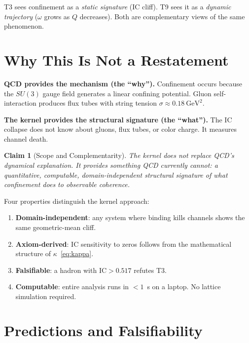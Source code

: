 \documentclass[
  aps,
  prd,
  twocolumn,
  superscriptaddress,
  nofootinbib,
  floatfix
]{revtex4-2}
\newtheorem{claim}{Claim}
\newcommand{\IC}{\mathrm{IC}}
\begin{document}
T3 sees confinement as a \emph{static signature} (IC cliff).
T9 sees it as a \emph{dynamic trajectory} ($\omega$ grows as
$Q$ decreases).  Both are complementary views of the same
phenomenon.


\section{Why This Is Not a Restatement}\label{sec:novelty}

\textbf{QCD provides the mechanism (the ``why'').}
Confinement occurs because the $SU(3)$ gauge field generates a
linear confining potential.  Gluon self-interaction produces
flux tubes with string tension
$\sigma \approx 0.18~\mathrm{GeV}^2$.

\textbf{The kernel provides the structural signature
(the ``what'').}  The IC collapse does not know about gluons,
flux tubes, or color charge.  It measures channel death.

\begin{claim}[Scope and Complementarity]\label{claim:scope}
The kernel does not replace QCD's dynamical explanation.  It
provides something QCD currently cannot: a quantitative,
computable, domain-independent structural signature of what
confinement does to observable coherence.
\end{claim}

Four properties distinguish the kernel approach:
\begin{enumerate}
\item \textbf{Domain-independent}: any system where binding kills
  channels shows the same geometric-mean cliff.
\item \textbf{Axiom-derived}: IC sensitivity to zeros follows
  from the mathematical structure of
  $\kappa$~\eqref{eq:kappa}.
\item \textbf{Falsifiable}: a hadron with
  $\IC > 0.517$ refutes T3.
\item \textbf{Computable}: entire analysis runs in $<1$~s on a
  laptop.  No lattice simulation required.
\end{enumerate}


\section{Predictions and Falsifiability}\label{sec:predictions}
\end{document}
